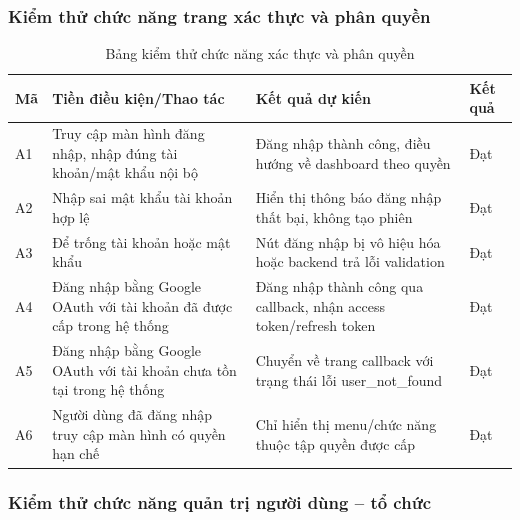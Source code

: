 \subsubsection{Kiểm thử chức năng trang xác thực và phân quyền}

\begin{table}[H]
\centering
\renewcommand{\arraystretch}{1.2}
\small
\begin{tabular}{|p{2.0cm}|p{4.8cm}|p{4.5cm}|p{3.2cm}|}
\hline
\textbf{Mã} & \textbf{Tiền điều kiện/Thao tác} & \textbf{Kết quả dự kiến} & \textbf{Kết quả} \\
\hline
A1 & Truy cập màn hình đăng nhập, nhập đúng tài khoản/mật khẩu nội bộ & Đăng nhập thành công, điều hướng về dashboard theo quyền & Đạt \\
\hline
A2 & Nhập sai mật khẩu tài khoản hợp lệ & Hiển thị thông báo đăng nhập thất bại, không tạo phiên & Đạt \\
\hline
A3 & Để trống tài khoản hoặc mật khẩu & Nút đăng nhập bị vô hiệu hóa hoặc backend trả lỗi validation & Đạt \\
\hline
A4 & Đăng nhập bằng Google OAuth với tài khoản đã được cấp trong hệ thống & Đăng nhập thành công qua callback, nhận access token/refresh token & Đạt \\
\hline
A5 & Đăng nhập bằng Google OAuth với tài khoản chưa tồn tại trong hệ thống & Chuyển về trang callback với trạng thái lỗi user\_not\_found & Đạt \\
\hline
A6 & Người dùng đã đăng nhập truy cập màn hình có quyền hạn chế & Chỉ hiển thị menu/chức năng thuộc tập quyền được cấp & Đạt \\
\hline
\end{tabular}
\caption{Bảng kiểm thử chức năng xác thực và phân quyền}
\end{table}

\subsubsection{Kiểm thử chức năng quản trị người dùng -- tổ chức}

